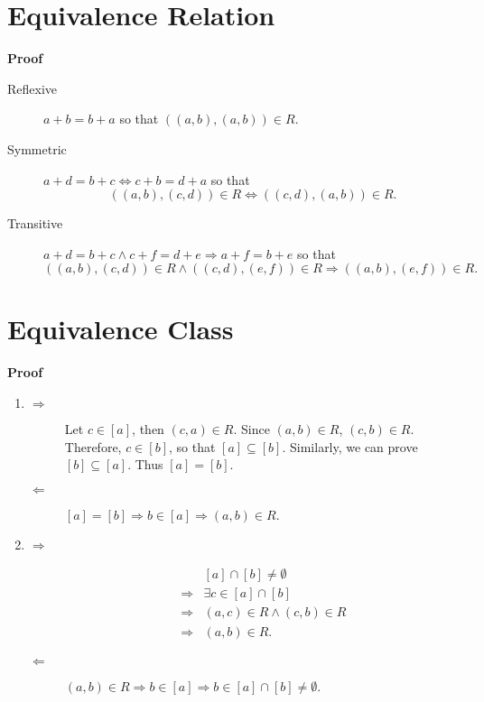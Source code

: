 \documentclass{../../cls/sig-alternate-05-2015}
\begin{document}
\section{Equivalence Relation}
\textbf{Proof}\begin{description}
    \item[Reflexive] $a + b = b + a$ so that $((a, b), (a, b)) \in R$.
    \item[Symmetric] $a + d = b + c \Leftrightarrow c + b = d + a$ so that \begin{equation}
        ((a, b), (c, d)) \in R \Leftrightarrow ((c, d), (a, b)) \in R.
    \end{equation}
    \item[Transitive] $a + d = b + c \land c + f = d + e \Rightarrow a + f = b + e$ so that \begin{equation}
        ((a, b), (c, d)) \in R \land ((c, d), (e, f)) \in R \Rightarrow ((a, b), (e, f)) \in R.
    \end{equation}
\end{description}

\section{Equivalence Class}
\textbf{Proof}\begin{enumerate}[label=(\alph*)]
    \item \begin{description}
        \item[$\Rightarrow$] Let $c \in [a]$, then $(c, a) \in R$. Since $(a, b) \in R$, $(c, b) \in R$. Therefore, $c \in [b]$, so that $[a] \subseteq [b]$. Similarly, we can prove $[b] \subseteq [a]$. Thus $[a] = [b]$.
        \item[$\Leftarrow$] $[a] = [b] \Rightarrow b \in [a] \Rightarrow (a, b) \in R$.
    \end{description}
    \item \begin{description}
        \item[$\Rightarrow$] \begin{align}
            \begin{aligned}
            & [a] \cap [b] \ne \emptyset\\
            \Rightarrow & \exists c \in [a] \cap [b]\\
            \Rightarrow & (a, c) \in R \land (c, b) \in R\\
            \Rightarrow & (a, b) \in R.
            \end{aligned}
        \end{align}
        \item[$\Leftarrow$] $(a, b) \in R \Rightarrow b \in [a] \Rightarrow b \in [a] \cap [b] \ne \emptyset$.
    \end{description}
\end{enumerate}
\end{document}
